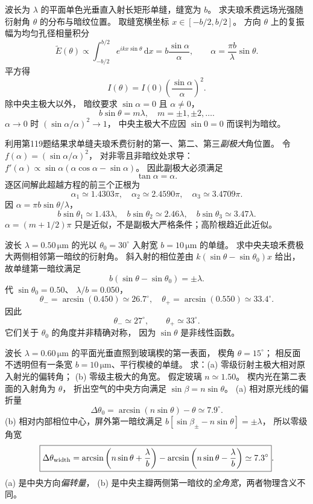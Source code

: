 波长为 $\lambda$ 的平面单色光垂直入射长矩形单缝，缝宽为 $b$。
求夫琅禾费远场光强随衍射角 $\theta$ 的分布与暗纹位置。
\exsolution
取缝宽横坐标 $x\in[-b/2,b/2]$。
方向 $\theta$ 上的复振幅为均匀孔径相量积分
\[
\widetilde E(\theta)\propto
\int_{-b/2}^{b/2}e^{ikx\sin\theta}\,\mathrm dx
=b\frac{\sin\alpha}{\alpha},
\qquad
\alpha=\frac{\pi b}{\lambda}\sin\theta.
\]
平方得
\[
\boxed{I(\theta)=I(0)
\left(\frac{\sin\alpha}{\alpha}\right)^2}.
\]
除中央主极大以外，
暗纹要求 $\sin\alpha=0$ 且 $\alpha\ne0$，
\[
\boxed{b\sin\theta=m\lambda},
\quad m=\pm1,\pm2,\ldots .
\]
\excheck $\alpha\to0$ 时
$(\sin\alpha/\alpha)^2\to1$，
中央主极大不应因 $\sin0=0$ 而误判为暗纹。

利用第119题结果求单缝夫琅禾费衍射的第一、第二、第三\emph{副极大}角位置。
\exsolution
令
$f(\alpha)=(\sin\alpha/\alpha)^2$，
对非零且非暗纹处求导：
$f'(\alpha)\propto
\sin\alpha(\alpha\cos\alpha-\sin\alpha)$。
因此副极大必须满足
\[
\boxed{\tan\alpha=\alpha}.
\]
逐区间解此超越方程的前三个正根为
\[
\alpha_1\simeq1.4303\pi,\quad
\alpha_2\simeq2.4590\pi,\quad
\alpha_3\simeq3.4709\pi.
\]
因 $\alpha=\pi b\sin\theta/\lambda$，
\[
\boxed{b\sin\theta_1\simeq1.43\lambda},\quad
\boxed{b\sin\theta_2\simeq2.46\lambda},\quad
\boxed{b\sin\theta_3\simeq3.47\lambda}.
\]
\excheck $\alpha=(m+1/2)\pi$ 只是近似，不是副极大严格条件；高阶根趋近此近似。

波长
$\lambda=0.50\,\mathrm{\mu m}$ 的光以
$\theta_0=30^\circ$ 入射宽
$b=10\,\mathrm{\mu m}$ 的单缝。
求中央夫琅禾费极大两侧相邻第一暗纹的衍射角。
\exsolution
斜入射的相位差由
$k(\sin\theta-\sin\theta_0)x$ 给出，
故单缝第一暗纹满足
\[
\boxed{b(\sin\theta-\sin\theta_0)=\pm\lambda}.
\]
代
$\sin\theta_0=0.50$、
$\lambda/b=0.050$，
\[
\theta_-=\arcsin(0.450)\simeq26.7^\circ,\quad
\theta_+=\arcsin(0.550)\simeq33.4^\circ .
\]
因此
\[
\boxed{\theta_-\simeq27^\circ,\qquad
\theta_+\simeq33^\circ}.
\]
\excheck 它们关于 $\theta_0$ 的角度并非精确对称，
因为 $\sin\theta$ 是非线性函数。

波长 $\lambda=0.60\,\mathrm{\mu m}$ 的平面光垂直照到玻璃楔的第一表面，
楔角 $\theta=15^\circ$；
相反面不透明但有一条宽
$b=10\,\mathrm{\mu m}$、平行楔棱的单缝。
求：(a) 零级衍射主极大相对原入射光的偏转角；
(b) 零级主极大的角宽。
\exsolution
假定玻璃 $n\simeq1.50$。
楔内光在第二表面的入射角为 $\theta$，
折出空气的中央方向满足
$\sin\beta=n\sin\theta$。
(a) 相对原光线的偏折量
\[
\boxed{\Delta\theta_0=\arcsin(n\sin\theta)-\theta
\simeq7.9^\circ}.
\]
(b) 相对内部相位中心，屏外第一暗纹满足
$b[\sin\beta_\pm-n\sin\theta]=\pm\lambda$，
所以零级角宽
\[
\boxed{\Delta\theta_{\rm width}=
\arcsin\left(n\sin\theta+\frac{\lambda}{b}\right)
-\arcsin\left(n\sin\theta-\frac{\lambda}{b}\right)
\simeq7.3^\circ}.
\]
\excheck (a) 是中央方向\emph{偏转量}，
(b) 是中央主瓣两侧第一暗纹的\emph{全角宽}，两者物理含义不同。

